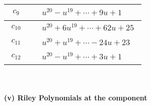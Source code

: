 \documentclass[1p]{elsarticle_modified}
\theoremstyle{definition}
\begin{document}
\begin{tabular}{m{50pt}|m{274pt}}
\hline $$\begin{aligned}c_{9}\end{aligned}$$&$\begin{aligned}
&u^{20}- u^{19}+\cdots+9 u+1
\end{aligned}$\\
\hline $$\begin{aligned}c_{10}\end{aligned}$$&$\begin{aligned}
&u^{20}+6 u^{19}+\cdots+62 u+25
\end{aligned}$\\
\hline $$\begin{aligned}c_{11}\end{aligned}$$&$\begin{aligned}
&u^{20}+u^{19}+\cdots-24 u+23
\end{aligned}$\\
\hline $$\begin{aligned}c_{12}\end{aligned}$$&$\begin{aligned}
&u^{20}- u^{19}+\cdots+3 u+1
\end{aligned}$\\
\hline
\end{tabular}\\~\\
\newpage\renewcommand{\arraystretch}{1}
\flushleft \textbf{(v) Riley Polynomials at the component}\newline \\
\end{document}
